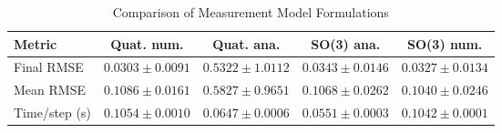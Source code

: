 \begin{table}[htbp]
\centering
\caption{Comparison of Measurement Model Formulations}
\label{tab:method_comparison}
\begin{tabular}{lcccc}
\hline
Metric & Quat. num. & Quat. ana. & SO(3) ana. & SO(3) num. \\
\hline
Final RMSE & $0.0303 \pm 0.0091$ & $0.5322 \pm 1.0112$ & $0.0343 \pm 0.0146$ & $0.0327 \pm 0.0134$ \\
Mean RMSE & $0.1086 \pm 0.0161$ & $0.5827 \pm 0.9651$ & $0.1068 \pm 0.0262$ & $0.1040 \pm 0.0246$ \\
Time/step (s) & $0.1054 \pm 0.0010$ & $0.0647 \pm 0.0006$ & $0.0551 \pm 0.0003$ & $0.1042 \pm 0.0001$ \\
\hline
\end{tabular}
\end{table}
